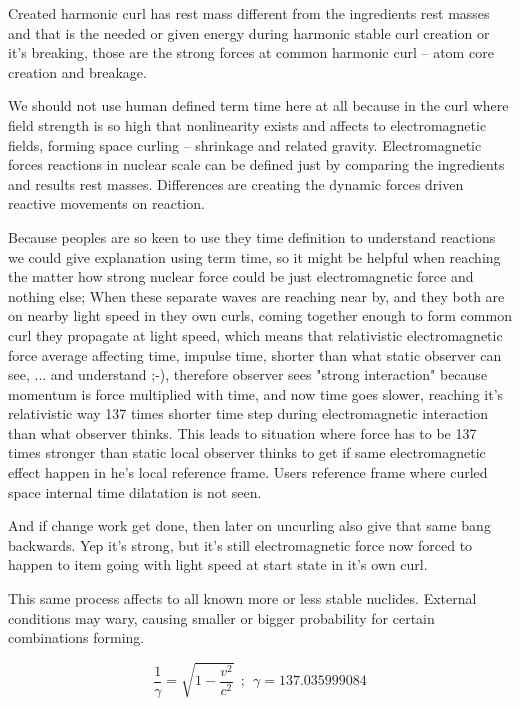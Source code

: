 Created harmonic curl has rest mass different from the ingredients rest masses
and that is the needed or given energy during harmonic stable curl creation or
it's breaking, those are the strong forces at common harmonic curl -- atom
core creation and breakage.

We should not use human defined term time here at all because in the curl
where field strength is so high that nonlinearity exists and affects to
electromagnetic fields, forming space curling -- shrinkage and related
gravity. Electromagnetic forces reactions in nuclear scale can be defined just
by comparing the ingredients and results rest masses. Differences are
creating the dynamic forces driven reactive movements on reaction.

Because peoples are so keen to use they time definition to understand
reactions we could give explanation using term time, so it might be helpful
when reaching the matter how strong nuclear force could be just
electromagnetic force and nothing else; When these separate waves are reaching
near by, and they both are on nearby light speed in they own curls, coming
together enough to form common curl they propagate at light speed, which means
that relativistic electromagnetic force average affecting time, impulse time,
shorter than what static observer can see, ... and understand ;-), therefore
observer sees "strong interaction" because momentum is force multiplied with
time, and now time goes slower, reaching it's relativistic way
137\allowbreak\cite{FineStructureConst} times shorter time step during
electromagnetic interaction than what observer thinks. This leads to situation
where force has to be 137 times stronger than static local observer thinks to
get if same electromagnetic effect happen in he's local reference frame. Users
reference frame where curled space internal time
dilatation\allowbreak\cite{TimeDilation} is not seen.

And if change work get done, then later on uncurling also give that same bang
backwards. Yep it's strong, but it's still electromagnetic force now forced
to happen to item going with light speed at start state in it's own curl.

This same process affects to all known more or less stable
nuclides\allowbreak\cite{Nuclides}. External conditions may wary, causing
smaller or bigger probability for certain combinations forming.

\begin{equation} \label{eq:clock_rate} %
 \frac{1}{\gamma}=\sqrt{1-\frac{v^2}{c^2}}~~;~~\gamma=137.035999084
\end{equation}

